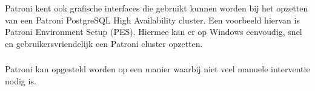 \subsubsection{}
\label{subsubsec:Grafische interface}

Patroni kent ook grafische interfaces die gebruikt kunnen worden bij het opzetten van een Patroni PostgreSQL High Availability cluster. Een voorbeeld hiervan is Patroni Environment Setup (PES). Hiermee kan er op Windows eenvoudig, snel en gebruikersvriendelijk een Patroni cluster opzetten.


\subsubsection{}
\label{subsubsec:Beperkte manuele interventie}

Patroni kan opgesteld worden op een manier waarbij niet veel manuele interventie nodig is.
